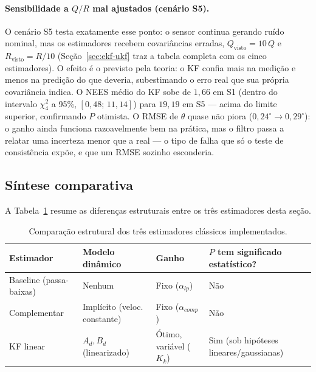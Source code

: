 \documentclass[brazil, 12pt]{article}
\begin{document}
\paragraph{Sensibilidade a $Q/R$ mal ajustados (cenário S5).} O cenário S5
testa exatamente esse ponto: o sensor continua gerando ruído nominal, mas os
estimadores recebem covariâncias erradas, $Q_{\text{visto}}=10\,Q$ e
$R_{\text{visto}}=R/10$ (Seção~\ref{sec:ekf-ukf} traz a tabela completa com os
cinco estimadores). O efeito é o previsto pela teoria: o KF confia mais na
medição e menos na predição do que deveria, subestimando o erro real que sua
própria covariância indica. O NEES médio do KF sobe de $1{,}66$ em S1 (dentro
do intervalo $\chi^2_4$ a 95\%, $[0{,}48;\,11{,}14]$) para $19{,}19$ em S5 ---
acima do limite superior, confirmando $P$ otimista. O RMSE de $\theta$ quase
não piora ($0{,}24^{\circ}\to0{,}29^{\circ}$): o ganho ainda funciona
razoavelmente bem na prática, mas o filtro passa a relatar uma incerteza
menor que a real --- o tipo de falha que só o teste de consistência expõe, e
que um RMSE sozinho esconderia.

\subsection{Síntese comparativa}
\label{sec:sintese-classicos}

A Tabela~\ref{tab:classicos} resume as diferenças estruturais entre os três
estimadores desta seção.

\begin{table}[H]
\centering
\small
\begin{tabular}{@{}p{3.1cm} p{3.4cm} p{2.6cm} p{3.3cm}@{}}
\hline
\textbf{Estimador} & \textbf{Modelo dinâmico} & \textbf{Ganho} & \textbf{$P$ tem significado estatístico?} \\
\hline
Baseline (passa-baixas)  & Nenhum                        & Fixo ($\alpha_{lp}$)             & Não \\[2pt]
Complementar             & Implícito (veloc. constante)  & Fixo ($\alpha_{comp}$)           & Não \\[2pt]
KF linear                & $A_d,B_d$ (linearizado)       & Ótimo, variável ($K_k$)          & Sim (sob hipóteses lineares/gaussianas) \\
\hline
\end{tabular}
\caption{Comparação estrutural dos três estimadores clássicos implementados.}
\label{tab:classicos}
\end{table}
\end{document}
